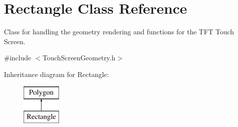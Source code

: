 \hypertarget{class_rectangle}{\section{Rectangle Class Reference}
\label{class_rectangle}
}


Class for handling the geometry rendering and functions for the T\+F\+T Touch Screen.  




{\ttfamily \#include $<$Touch\+Screen\+Geometry.\+h$>$}

Inheritance diagram for Rectangle\+:\begin{figure}[H]
\begin{center}
\leavevmode
\includegraphics[height=2.000000cm]{class_rectangle}
\end{center}
\end{figure}

